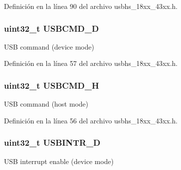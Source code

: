 Definición en la línea 90 del archivo usbhs\+\_\+18xx\+\_\+43xx.\+h.

\subsubsection[{\texorpdfstring{U\+S\+B\+C\+M\+D\+\_\+D}{USBCMD_D}}]{ uint32\+\_\+t U\+S\+B\+C\+M\+D\+\_\+D}\hypertarget{struct_l_p_c___u_s_b_h_s___t_aa717d3a3ddc444c944da23ff3ce81d84}{}\label{struct_l_p_c___u_s_b_h_s___t_aa717d3a3ddc444c944da23ff3ce81d84}
U\+SB command (device mode) 

Definición en la línea 57 del archivo usbhs\+\_\+18xx\+\_\+43xx.\+h.

\subsubsection[{\texorpdfstring{U\+S\+B\+C\+M\+D\+\_\+H}{USBCMD_H}}]{ uint32\+\_\+t U\+S\+B\+C\+M\+D\+\_\+H}\hypertarget{struct_l_p_c___u_s_b_h_s___t_ae6942ad74f6fe7c21f0c3cbaa6ae8ee1}{}\label{struct_l_p_c___u_s_b_h_s___t_ae6942ad74f6fe7c21f0c3cbaa6ae8ee1}
U\+SB command (host mode) 

Definición en la línea 56 del archivo usbhs\+\_\+18xx\+\_\+43xx.\+h.

\subsubsection[{\texorpdfstring{U\+S\+B\+I\+N\+T\+R\+\_\+D}{USBINTR_D}}]{ uint32\+\_\+t U\+S\+B\+I\+N\+T\+R\+\_\+D}\hypertarget{struct_l_p_c___u_s_b_h_s___t_adc4b59f09357786ae059e4390b039709}{}\label{struct_l_p_c___u_s_b_h_s___t_adc4b59f09357786ae059e4390b039709}
U\+SB interrupt enable (device mode) 

